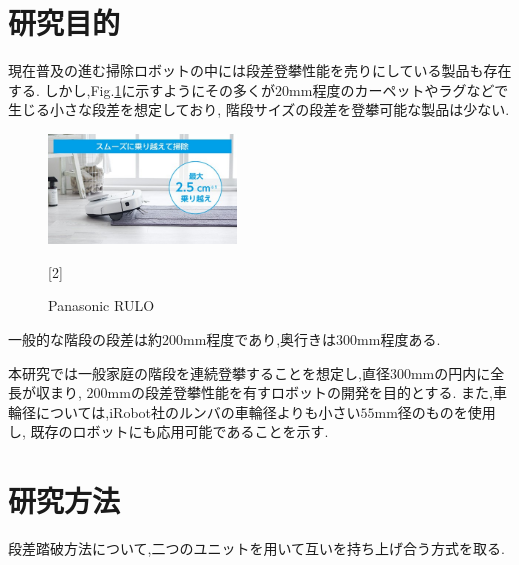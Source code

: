 \documentclass[dvipdfmx]{jsarticle}
\begin{document}
\section{研究目的}
現在普及の進む掃除ロボットの中には段差登攀性能を売りにしている製品も存在する.
しかし,Fig.\ref{fig:rulo}に示すようにその多くが$20\mathrm{mm}$程度のカーペットやラグなどで生じる小さな段差を想定しており,
階段サイズの段差を登攀可能な製品は少ない.
\begin{figure}[H]
  \centering
  \includegraphics[width=50mm]{image/rulo.jpg}
  \caption{Panasonic RULO}
  [2]
\label{fig:rulo}
\end{figure}

一般的な階段の段差は約$200\mathrm{mm}$程度であり,奥行きは$300\mathrm{mm}$程度ある.

本研究では一般家庭の階段を連続登攀することを想定し,直径$300\mathrm{mm}$の円内に全長が収まり,
$200\mathrm{mm}$の段差登攀性能を有すロボットの開発を目的とする.
また,車輪径については,iRobot社のルンバの車輪径よりも小さい$55\mathrm{mm}$径のものを使用し,
既存のロボットにも応用可能であることを示す.

\section{研究方法}
段差踏破方法について,二つのユニットを用いて互いを持ち上げ合う方式を取る.
\end{document}
